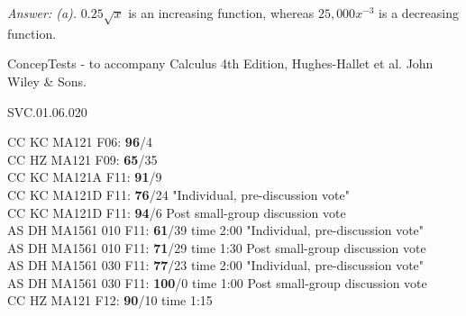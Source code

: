 {\it Answer: (a).} $0.25 \sqrt{x}$ is an increasing function, whereas $25,000 x^{-3}$ is a decreasing function.

\medskip
ConcepTests - to accompany Calculus 4th Edition, Hughes-Hallet et al. John Wiley \& Sons.

SVC.01.06.020

CC KC MA121 F06: {\bf 96}/4 \\
CC HZ MA121 F09: {\bf 65}/35  \\
CC KC MA121A F11: {\bf 91}/9  \\
CC KC MA121D F11: {\bf 76}/24 "Individual, pre-discussion vote" \\
CC KC MA121D F11: {\bf 94}/6 Post small-group discussion vote \\
AS DH MA1561 010 F11: {\bf 61}/39 time 2:00 "Individual, pre-discussion vote" \\
AS DH MA1561 010 F11: {\bf 71}/29 time 1:30 Post small-group discussion vote \\
AS DH MA1561 030 F11: {\bf 77}/23 time 2:00 "Individual, pre-discussion vote" \\
AS DH MA1561 030 F11: {\bf 100}/0 time 1:00 Post small-group discussion vote \\
CC HZ MA121 F12: {\bf 90}/10 time 1:15  \\
